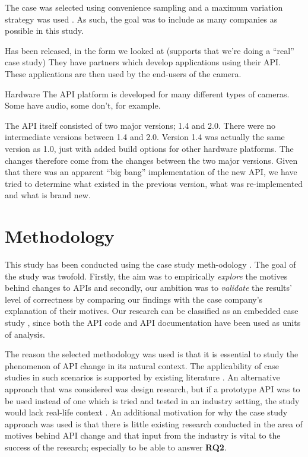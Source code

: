 \documentclass{sig-alternate}
\begin{document}

The case was selected using convenience sampling \cite{flyvbjerg2006five} and a maximum variation strategy was used \cite{benbasat1987case}. As such, the goal was to include as many companies as possible in this study.


Has been released, in the form we looked at (supports that we’re doing a ``real'' case study)
They have partners which develop applications using their API. These applications are then used by the end-users of the camera. 

Hardware
The API platform is developed for many different types of cameras. 
Some have audio, some don’t, for example.

The API itself consisted of two major versions; 1.4 and 2.0. There were no intermediate versions between 1.4 and 2.0. Version 1.4 was actually the same version as 1.0, just with added build options for other hardware platforms. The changes therefore come from the changes between the two major versions. Given that there was an apparent ``big bang'' implementation of the new API, we have tried to determine what existed in the previous version, what was re-implemented and what is brand new.



\section{Methodology} \label{methodology}
This study has been conducted using the case study meth-odology \cite{runeson2009guidelines}. The goal of the study was twofold. Firstly, the aim was to empirically \textit{explore} the motives behind changes to APIs and secondly, our ambition was to \textit{validate} the results' level of correctness by comparing our findings with the case company's explanation of their motives. Our research can be classified as an embedded case study \cite{yin2013case}, since both the API code and API documentation have been used as units of analysis. 

The reason the selected methodology was used is that it is essential to study the phenomenon of API change in its natural context. The applicability of case studies in such scenarios is supported by existing literature \cite{benbasat1987case} \cite{runeson2009guidelines} \cite{yin2013case} \cite{robson2002real}. An alternative approach that was considered was design research, but if a prototype API was to be used instead of one which is tried and tested in an industry setting, the study would lack real-life context \cite{runeson2009guidelines}. An additional motivation for why the case study approach was used is that there is little existing research conducted in the area of motives behind API change and that input from the industry is vital to the success of the research; especially to be able to answer \textbf{RQ2}. 
\end{document}
